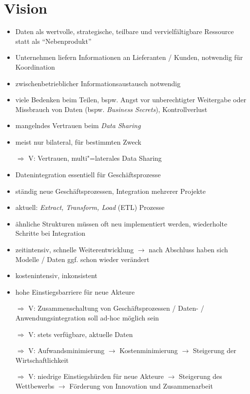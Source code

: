 
\section{Vision}

\begin{itemize}
    \item Daten als wertvolle, strategische, teilbare und vervielfältigbare Ressource statt als \enquote{Nebenprodukt}~\cite{mollerIndustrialDataEcosystems2024}
    \item Unternehmen liefern Informationen an Lieferanten / Kunden, notwendig für Koordination~\cite{mollerIndustrialDataEcosystems2024}
    \item zwischenbetrieblicher Informationsaustausch notwendig~\cite{mollerIndustrialDataEcosystems2024}
    \item viele Bedenken beim Teilen, bspw. Angst vor unberechtigter Weitergabe oder Missbrauch von Daten (bspw. \emph{Business Secrets}), Kontrollverlust~\cite{mollerIndustrialDataEcosystems2024}
    \item mangelndes Vertrauen beim \emph{Data Sharing}
    \item meist nur bilateral, für bestimmten Zweck~\cite{mollerIndustrialDataEcosystems2024}
    \item[$\Rightarrow$] V: Vertrauen, multi"=laterales Data Sharing
\end{itemize}

\vspace{1cm}

\begin{itemize}
    \item Datenintegration essentiell für Geschäftsprozesse
    \item ständig neue Geschäftsprozessen, Integration mehrerer Projekte
    \item aktuell: \emph{Extract, Transform, Load} (ETL) Prozesse
    \item ähnliche Strukturen müssen oft neu implementiert werden, wiederholte Schritte bei Integration
    \item zeitintensiv, schnelle Weiterentwicklung $\to$ nach Abschluss haben sich Modelle / Daten ggf. schon wieder verändert
    \item kostenintensiv, inkonsistent
    \item hohe Einstiegsbarriere für neue Akteure
    \item[$\Rightarrow$] V: Zusammenschaltung von Geschäftsprozessen / Daten- / Anwendungsintegration soll ad-hoc möglich sein
    \item[$\Rightarrow$] V: stets verfügbare, aktuelle Daten
    \item[$\Rightarrow$] V: Aufwandsminimierung $\to$ Kostenminimierung $\to$ Steigerung der Wirtschaftlichkeit
    \item[$\Rightarrow$] V: niedrige Einstiegshürden für neue Akteure $\to$ Steigerung des Wettbewerbs $\to$ Förderung von Innovation und Zusammenarbeit
\end{itemize}


